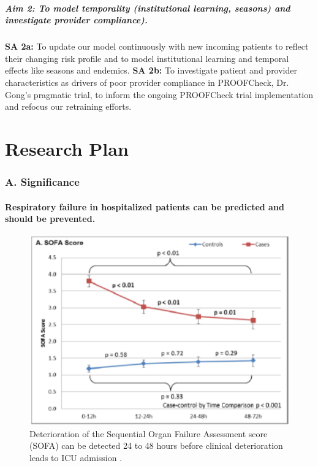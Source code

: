 \documentclass[11pt,notitlepage]{article}
\begin{document}
\subsubsection*{Aim 2: To model temporality (institutional learning, seasons) and investigate provider compliance).}
\textbf{SA 2a:} To update our model continuously with new incoming patients to reflect their changing risk profile and to model institutional learning and temporal effects like seasons and endemics. 
\newline \textbf{SA 2b:} To investigate patient and provider characteristics as drivers of poor provider compliance in PROOFCheck, Dr. Gong's pragmatic trial, to inform the ongoing PROOFCheck trial implementation and refocus our retraining efforts. 
\newpage
\part*{Research Plan}

\section*{A. Significance}

\subsection*{Respiratory failure in hospitalized patients can be predicted and should be prevented.} 

\begin{figure}
 \vspace{-70pt}
 \includegraphics[scale=0.7]{Figures/SOFA_fig.png}
  \vspace{-30pt}
  \caption{\footnotesize Deterioration of the Sequential Organ Failure Assessment score (SOFA) can be detected 24 to 48 hours before clinical deterioration leads to ICU admission \cite{Yu_24970344}.}
    \label{fig:SOFA_fig}
 \vspace{-20pt}
\end{figure}
\end{document}
